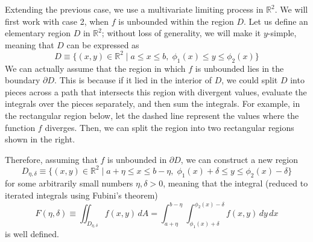   Extending the previous case, we use a multivariate limiting process in $\mathbb{R}^2$. We will first work with case 2, when $f$ is unbounded within the region $D$. Let us define an elementary region $D$ in $\mathbb{R}^2$; without loss of generality, we will make it $y$-simple, meaning that $D$ can be expressed as
    \[D \equiv \{ (x, y) \in \mathbb{R}^2 \; | \; a \leq x \leq b, \; \phi_1 (x) \leq y \leq \phi_2 (x)\}\]
  We can actually assume that the region in which $f$ is unbounded lies in the boundary $\partial D$. This is because if it lied in the interior of $D$, we could split $D$ into pieces across a path that intersects this region with divergent values, evaluate the integrals over the pieces separately, and then sum the integrals. For example, in the rectangular region below, let the dashed line represent the values where the function $f$ diverges. Then, we can split the region into two rectangular regions shown in the right. 
  \begin{center}
  \end{center}
  Therefore, assuming that $f$ is unbounded in $\partial D$, we can construct a new region 
  \[D_{\eta, \delta} \equiv \{(x, y) \in \mathbb{R}^2 \; | \; a + \eta \leq x \leq b - \eta, \; \phi_1 (x) + \delta \leq y \leq \phi_2 (x) - \delta\}\]
  for some arbitrarily small numbers $\eta, \delta >0$, meaning that the integral (reduced to iterated integrals using Fubini's theorem) 
  \[F(\eta, \delta) \equiv \iint_{D_{\eta, \delta}} f(x, y) \, dA = \int_{a + \eta}^{b - \eta} \int_{\phi_1 (x) + \delta}^{\phi_2 (x) - \delta} f(x, y) \, dy\,dx\]
  is well defined. 
  \begin{center}
  \end{center}
